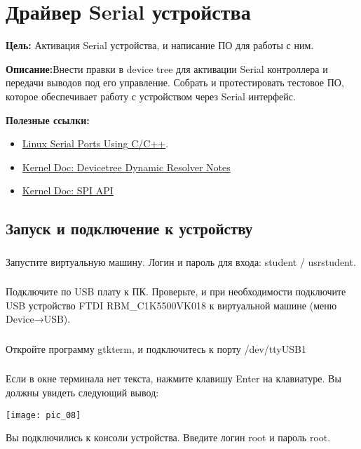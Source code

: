 \chapter{Драйвер Serial устройства}
\textbf{Цель:} Активация Serial устройства, и написание ПО для работы с ним.

\vspace{5mm}
\textbf{Описание:}Внести правки в device tree для активации Serial контроллера и передачи выводов под его управление. Собрать и протестировать тестовое ПО, которое обеспечивает работу с устройством через Serial интерфейс.

\vspace{5mm}
\textbf{Полезные ссылки:}
\begin{itemize}
	\item \href{https://blog.mbedded.ninja/programming/operating-systems/linux/linux-serial-ports-using-c-cpp/}{Linux Serial Ports Using C/C++}.
	\item \href{https://docs.kernel.org/devicetree/dynamic-resolution-notes.html}{Kernel Doc: Devicetree Dynamic Resolver Notes}
	\item \href{https://www.kernel.org/doc/html/v4.15/driver-api/spi.html}{Kernel Doc: SPI API}	
\end{itemize}

\section{Запуск и подключение к устройству}

\subsection{}Запустите виртуальную машину. Логин и пароль для входа: student / usrstudent.

\subsection{}Подключите по USB плату к ПК. Проверьте, и при необходимости подключите USB устройство FTDI RBM\_C1K5500VK018 к виртуальной машине (меню Device→USB).

\subsection{}Откройте программу gtkterm, и подключитесь к порту /dev/ttyUSB1

\subsection{}Если в окне терминала нет текста, нажмите клавишу Enter на клавиатуре. Вы должны увидеть следующий вывод:
\begin{center}
	\texttt{[image: pic\_08]}
\end{center}
Вы подключились к консоли устройства. Введите логин root и пароль root.


